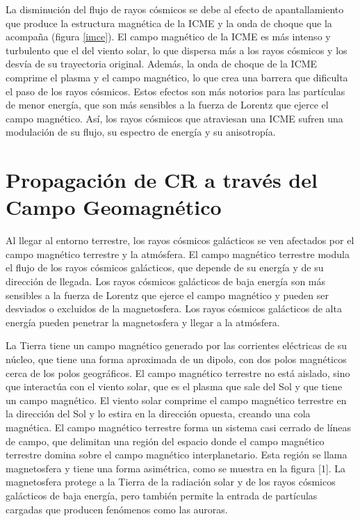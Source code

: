 La disminución del flujo de rayos cósmicos se debe al efecto de apantallamiento que produce la estructura magnética de la ICME y la onda de choque que la acompaña (figura \ref{imce}). El campo magnético de la ICME es más intenso y turbulento que el del viento solar, lo que dispersa más a los rayos cósmicos y los desvía de su trayectoria original. Además, la onda de choque de la ICME comprime el plasma y el campo magnético, lo que crea una barrera que dificulta el paso de los rayos cósmicos. Estos efectos son más notorios para las partículas de menor energía, que son más sensibles a la fuerza de Lorentz que ejerce el campo magnético. Así, los rayos cósmicos que atraviesan una ICME sufren una modulación de su flujo, su espectro de energía y su anisotropía.

\section{Propagación de CR a través del Campo Geomagnético}

Al llegar al entorno terrestre, los rayos cósmicos galácticos se ven afectados por el campo magnético terrestre y la atmósfera. El campo magnético terrestre modula el flujo de los rayos cósmicos galácticos, que depende de su energía y de su dirección de llegada. Los rayos cósmicos galácticos de baja energía son más sensibles a la fuerza de Lorentz que ejerce el campo magnético y pueden ser desviados o excluidos de la magnetosfera. Los rayos cósmicos galácticos de alta energía pueden penetrar la magnetosfera y llegar a la atmósfera.

La Tierra tiene un campo magnético generado por las corrientes eléctricas de su núcleo, que tiene una forma aproximada de un dipolo, con dos polos magnéticos cerca de los polos geográficos. El campo magnético terrestre no está aislado, sino que interactúa con el viento solar, que es el plasma que sale del Sol y que tiene un campo magnético. El viento solar comprime el campo magnético terrestre en la dirección del Sol y lo estira en la dirección opuesta, creando una cola magnética. El campo magnético terrestre forma un sistema casi cerrado de líneas de campo, que delimitan una región del espacio donde el campo magnético terrestre domina sobre el campo magnético interplanetario. Esta región se llama magnetosfera y tiene una forma asimétrica, como se muestra en la figura [1]. La magnetosfera protege a la Tierra de la radiación solar y de los rayos cósmicos galácticos de baja energía, pero también permite la entrada de partículas cargadas que producen fenómenos como las auroras.


